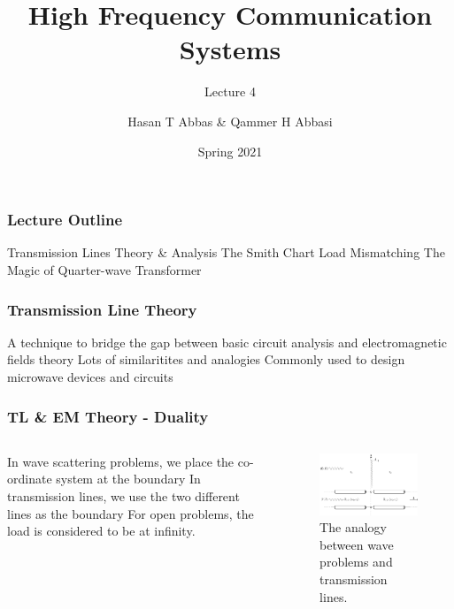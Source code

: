 \documentclass[10pt, compress]{beamer}
\title{High Frequency Communication Systems}
\subtitle{Lecture 4}
\date{Spring 2021}
\author{Hasan T Abbas \& Qammer H Abbasi}
\begin{document}
\maketitle

\begin{frame}[fragile]
  \frametitle{Lecture Outline}
\begin{outline}[itemize]
  \1 Transmission Lines Theory \& Analysis
  \1 The Smith Chart 
  \1 Load Mismatching
  \1 The Magic of Quarter-wave Transformer
\end{outline}
\end{frame}
\begin{frame}[fragile]
\frametitle{Transmission Line Theory}
\begin{outline}
  \1 A technique to bridge the gap between basic circuit analysis and electromagnetic fields theory
   \2 Lots of similaritites and analogies
    \1 Commonly used to design microwave devices and circuits
\end{outline}
\end{frame}

\begin{frame}
  \frametitle{TL \& EM Theory - Duality}
  \begin{columns}[T] %
  \begin{column}{.3\textwidth}
\begin{outline}
  \1 In wave scattering problems, we place the co-ordinate system at the boundary
  \1 In transmission lines, we use the two different lines as the boundary
  \1 For open problems, the load is considered to be at infinity.
  \end{outline}
   \end{column}
 \begin{column}[T]{.7\textwidth}
    \begin{figure}
      \centering
          \includegraphics[width=.9\textwidth]{circuit.pdf}
      \caption{The analogy between wave problems and transmission lines.}
    \end{figure}
      \end{column}%
\end{columns}
  \end{frame}
\end{document}
